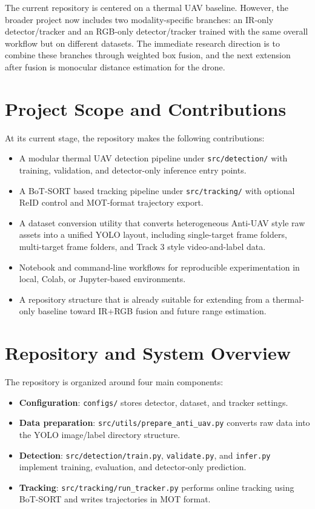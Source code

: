 \documentclass[10pt,conference]{IEEEtran}
\begin{document}
The current repository is centered on a thermal UAV baseline. However, the broader project now includes two modality-specific branches: an IR-only detector/tracker and an RGB-only detector/tracker trained with the same overall workflow but on different datasets. The immediate research direction is to combine these branches through weighted box fusion, and the next extension after fusion is monocular distance estimation for the drone.

\section{Project Scope and Contributions}
At its current stage, the repository makes the following contributions:

\begin{itemize}[leftmargin=1.5em]
    \item A modular thermal UAV detection pipeline under \texttt{src/detection/} with training, validation, and detector-only inference entry points.
    \item A BoT-SORT based tracking pipeline under \texttt{src/tracking/} with optional ReID control and MOT-format trajectory export.
    \item A dataset conversion utility that converts heterogeneous Anti-UAV style raw assets into a unified YOLO layout, including single-target frame folders, multi-target frame folders, and Track 3 style video-and-label data.
    \item Notebook and command-line workflows for reproducible experimentation in local, Colab, or Jupyter-based environments.
    \item A repository structure that is already suitable for extending from a thermal-only baseline toward IR+RGB fusion and future range estimation.
\end{itemize}

\section{Repository and System Overview}
The repository is organized around four main components:

\begin{itemize}[leftmargin=1.5em]
    \item \textbf{Configuration}: \texttt{configs/} stores detector, dataset, and tracker settings.
    \item \textbf{Data preparation}: \texttt{src/utils/prepare\_anti\_uav.py} converts raw data into the YOLO image/label directory structure.
    \item \textbf{Detection}: \texttt{src/detection/train.py}, \texttt{validate.py}, and \texttt{infer.py} implement training, evaluation, and detector-only prediction.
    \item \textbf{Tracking}: \texttt{src/tracking/run\_tracker.py} performs online tracking using BoT-SORT and writes trajectories in MOT format.
\end{itemize}
\end{document}
